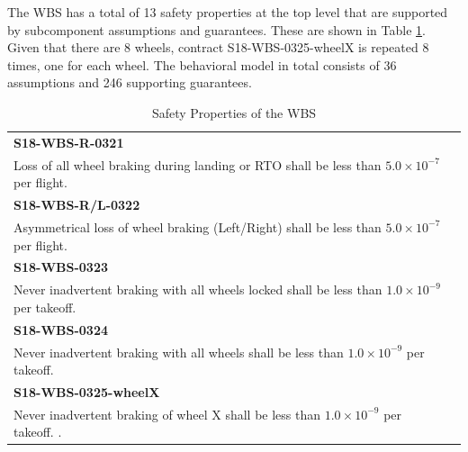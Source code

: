 The WBS has a total of 13 safety properties at the top level that are supported by subcomponent assumptions and guarantees. These are shown in Table \ref{tab:safetyProperties}. Given that there are 8 wheels, contract S18-WBS-0325-wheelX is repeated 8 times, one for each wheel. The behavioral model in total consists of 36 assumptions and 246 supporting guarantees.
\begin{center}
\begin{table}[htbp]
\begin{tabular}{@{}ll}
\toprule
\textbf{S18-WBS-R-0321} \\Loss of all wheel braking during landing or RTO shall be less than $5.0 \times 10^{-7}$ per flight.                                    \\ \midrule 
\textbf{S18-WBS-R/L-0322}  \\ Asymmetrical loss of wheel braking (Left/Right) shall be less than $5.0 \times 10^{-7}$ per flight. \\ \midrule
\textbf{S18-WBS-0323} \\ Never inadvertent braking with all wheels locked shall be less than $1.0 \times 10^{-9}$ per takeoff.                                                                                                                                                                                                               \\ \midrule
\textbf{S18-WBS-0324}  \\ Never inadvertent braking with all wheels shall be less than $1.0 \times 10^{-9}$ per takeoff.                                                                                                            \\ \midrule
\textbf{S18-WBS-0325-wheelX} \\ Never inadvertent braking of wheel X shall be less than $1.0 \times 10^{-9}$ per takeoff.                                                                                                           .                                                                                                                 \\ \bottomrule
\end{tabular}
\caption{Safety Properties of the WBS}
\label{tab:safetyProperties}
\end{table} 
\end{center} 

